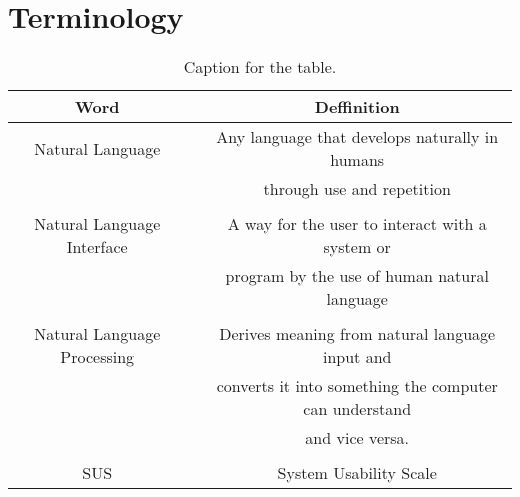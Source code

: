 \section{Terminology}

\begin{table}[h!]
  \centering
  \label{tab:table1}
  \begin{tabular}{ccc}
    \toprule
    Word &   & Deffinition\\
    \midrule
    Natural Language &   & Any language that develops naturally in humans \\
    & &  through use and repetition\\
    \\
    Natural Language Interface &   & A way for the user to interact with a system or \\
    & &  program by the use of human natural language\\
    \\
    Natural Language Processing &   & Derives meaning from natural language input and\\
    & &  converts it into something the computer can understand \\
    & &  and vice versa.\\
    \\
    SUS &   & System Usability Scale\\
    \bottomrule
  \end{tabular}
  \caption{Caption for the table.}
\end{table}